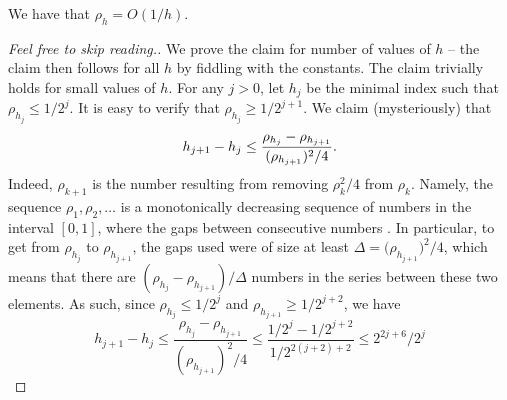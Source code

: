 \begin{lemma}
    We have that $\rho_h =O( 1/h)$.
\end{lemma}


\begin{proof}[Feel free to skip reading.]
    We prove the claim for  number of values of $h$ -- the
    claim then follows for all $h$ by fiddling with the constants.
    The claim trivially holds for small values of $h$. For any
    $j > 0$, let $h_j$ be the minimal index such that
    $\rho_{h_j} \leq 1/2^j$.  It is easy to verify that
    $\rho_{h_j} \geq 1/2^{j+1}$.  We claim (mysteriously) that
    \begin{equation*}
        \ds h_{j+1} - h_j%
        \leq%
        \frac{\rho_{h_{j}} - \rho_{h_{j+1}}} { (\rho_{h_{j+1}} )^2/4
        }.%
    \end{equation*}
    Indeed, $\rho_{k+1}$ is the number resulting from removing
    $\rho_k^2/4$ from $\rho_k$. Namely, the sequence
    $\rho_1, \rho_2, \ldots$ is a monotonically decreasing sequence of
    numbers in the interval $[0,1]$, where the gaps between
    consecutive numbers . In particular, to get from
    $\rho_{h_{j}}$ to $\rho_{h_{j+1}}$, the gaps used were of size at
    least $\Delta = \bigl(\rho_{h_{j+1}} \bigr)^2/4$, which means that
    there are  $(\rho_{h_{j}} - \rho_{h_{j+1}}) / \Delta$
    numbers in the series between these two elements.%
    As such, since
    $\rho_{h_{j}} \leq 1/2^{j}$ and $\rho_{h_{j+1}} \geq 1/2^{j+2}$,
    we have
    \begin{equation*}
        h_{j+1} - h_j%
        \leq%
        \frac{\rho_{h_{j}} - \rho_{h_{j+1}}} {
           ( \rho_{h_{j+1}} )^2/4 }%
        \leq%
        \frac{1/2^{j} - 1/2^{j+2}} { 1/2^{2(j+2)+2}}%
        \leq%
        2^{2j + 6} /2^{j}

\end{equation*}
\end{proof}
